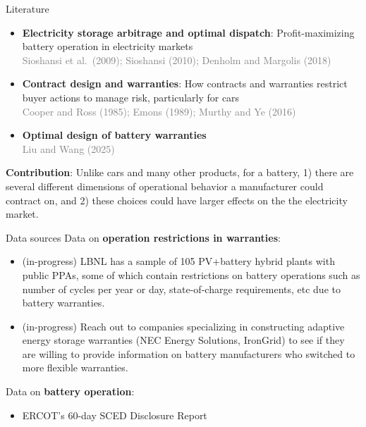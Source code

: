 \documentclass{beamer}
\begin{document}
\begin{frame}{Literature}
\begin{itemize}

\item \textbf{Electricity storage arbitrage and optimal dispatch}: 
Profit-maximizing battery operation in electricity markets \\
\textcolor{gray}{\small Sioshansi et al.\ (2009); Sioshansi (2010); 
Denholm and Margolis (2018)}


\item \textbf{Contract design and warranties}: 
How contracts and warranties restrict buyer actions to manage risk, particularly for cars \\
\textcolor{gray}{\small Cooper and Ross (1985); Emons (1989); Murthy and Ye (2016)}

\item \textbf{Optimal design of battery warranties} \\
\textcolor{gray}{Liu and Wang (2025)}

\end{itemize}

\vspace{0.2cm}

\textbf{Contribution}: Unlike cars and many other products, for a battery, 1) there are several different dimensions of operational behavior a manufacturer could contract on, and 2) these choices could have larger effects on the the electricity market.

\end{frame}
\begin{frame}{Data sources}
    Data on \textbf{operation restrictions in warranties}: 
    \begin{itemize}
        \item (in-progress) LBNL has a sample of 105 PV+battery hybrid plants with public PPAs, some of which contain restrictions on battery operations such as number of cycles per year or day, state-of-charge requirements, etc due to battery warranties. 
        \item (in-progress) Reach out to companies specializing in constructing adaptive energy storage warranties (NEC Energy Solutions, IronGrid) to see if they are willing to provide information on battery manufacturers who switched to more flexible warranties. 
    \end{itemize}

    \vspace{0.3cm}
    
    Data on \textbf{battery operation}: 
    \begin{itemize}
        \item ERCOT's 60-day SCED Disclosure Report
    \end{itemize}
\end{frame}
\end{document}
